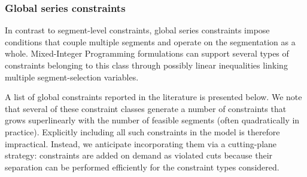 \documentclass[preprints,article,submit,pdftex,moreauthors]{Definitions/mdpi}
\begin{document}
\subsubsection{Global series constraints} \label{subsubsec:global_series_constraints}

In contrast to segment-level constraints, global series constraints impose conditions that couple multiple segments and operate on the segmentation as a whole. 
Mixed-Integer Programming formulations can support several types of constraints belonging to this class through possibly linear inequalities linking multiple segment-selection variables.

A list of global constraints reported in the literature is presented below. We note that several of these constraint classes generate a number of constraints that grows superlinearly with the number of feasible segments (often quadratically in practice). Explicitly including all such constraints in the model is therefore impractical. Instead, we anticipate incorporating them via a cutting-plane strategy: constraints are added on demand as violated cuts because their separation can be performed efficiently for the constraint types considered.
\end{document}
